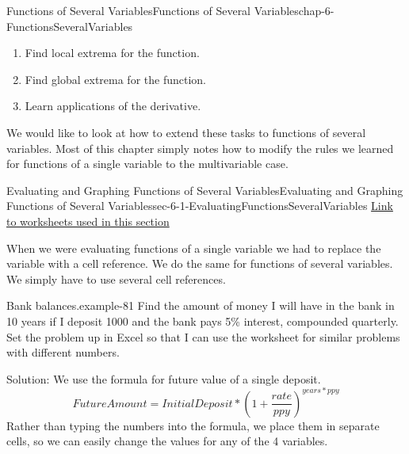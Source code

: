 \documentclass[oneside,10pt,]{book}
\numberwithin{equation}{section}
\begin{document}
\begin{chapterptx}{Functions of Several Variables}{}{Functions of Several Variables}{}{}{chap-6-FunctionsSeveralVariables}
\begin{introduction}{}
\begin{enumerate}[label=(\arabic*)]
\item\hypertarget{li-604}{}\hypertarget{p-2106}{}%
Find local extrema for the function.%
\item\hypertarget{li-605}{}\hypertarget{p-2107}{}%
Find global extrema for the function.%
\item\hypertarget{li-606}{}\hypertarget{p-2108}{}%
Learn applications of the derivative.%
\end{enumerate}
\hypertarget{p-2109}{}%
We would like to look at how to extend these tasks to functions of several variables.  Most of this chapter simply notes how to modify the rules we learned for functions of a single variable to the multivariable case.%
\end{introduction}%
%
%
\typeout{************************************************}
\typeout{************************************************}
%
\begin{sectionptx}{Evaluating and Graphing Functions of Several Variables}{}{Evaluating and Graphing Functions of Several Variables}{}{}{sec-6-1-EvaluatingFunctionsSeveralVariables}
\hypertarget{p-2110}{}%
\href{./Examples/Section-6-1-Examples.xlsx}{Link to worksheets used in this section}%
\par
\hypertarget{p-2111}{}%
When we were evaluating functions of a single variable we had to replace the variable with a cell reference.  We do the same for functions of several variables.  We simply have to use several cell references.%
\begin{example}{Bank balances.}{example-81}%
\hypertarget{p-2112}{}%
Find the amount of money I will have in the bank in 10 years if I deposit \textdollar{}1000 and the bank pays 5\% interest, compounded quarterly.  Set the problem up in Excel so that I can use the worksheet for similar problems with different numbers.%
\par
\hypertarget{p-2113}{}%
Solution: We use the formula for future value of a single deposit.%
%
\begin{equation*}
FutureAmount=InitialDeposit*\left(1+
\frac{rate}{ppy}\right)^{years*ppy}
\end{equation*}
\hypertarget{p-2114}{}%
Rather than typing the numbers into the formula, we place them in separate cells, so we can easily change the values for any of the 4 variables.%
\begin{sidebyside}{1}{0.3}{0.3}{0}%
\begin{sbspanel}{0.4}%

\end{sbspanel}
\end{sidebyside}
\end{example}
\end{sectionptx}
\end{chapterptx}
\end{document}
